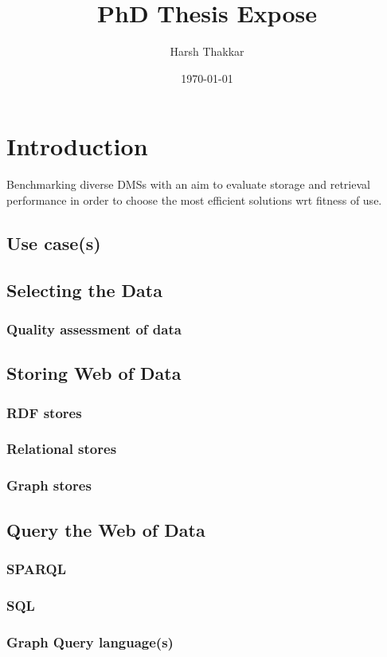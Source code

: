 \documentclass{article}
\title{PhD Thesis Expose}
\author{Harsh Thakkar}
\date{\today}
\begin{document}
\maketitle
\tableofcontents
\newpage

\section{Introduction}
Benchmarking diverse DMSs with an aim to evaluate storage and retrieval performance in order to choose the most efficient solutions wrt fitness of use. 
\subsection{Use case(s)}
\subsection{Selecting the Data}
\subsubsection{Quality assessment of data}

\subsection{Storing Web of Data}
\subsubsection{RDF stores}
\subsubsection{Relational stores}
\subsubsection{Graph stores}

\subsection{Query the Web of Data}
\subsubsection{SPARQL}
\subsubsection{SQL}
\subsubsection{Graph Query language(s)}
\end{document}
